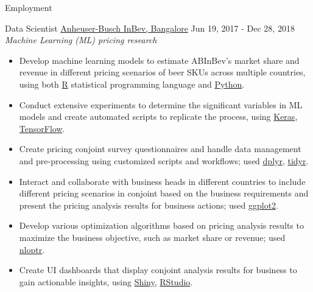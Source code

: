 \documentclass[]{mcdowellcv}
\begin{document}
\begin{cvsection}{Employment}
      \begin{cvsubsection}
        {Data Scientist}
        {\href{https://www.abinbev-india.com/}{Anheuser-Busch InBev, Bangalore}}
        {Jun 19, 2017 - Dec 28, 2018}
        \textit{Machine Learning (ML) pricing research}
          \begin{itemize}
            \item
              Develop machine learning models to estimate ABInBev's market
              share and revenue in different pricing scenarios of beer SKUs
              across multiple countries, using both
              \href{https://www.r-project.org/about.html}{R} statistical
              programming language and \href{https://www.python.org/}{Python}.
            \item
              Conduct extensive experiments to determine the significant
              variables in ML models and create automated scripts to replicate
              the process, using \href{https://keras.io/}{Keras},
              \href{https://www.tensorflow.org/}{TensorFlow}.
            \item
              Create pricing conjoint survey questionnaires and handle data
              management and pre-processing using customized scripts and
              workflows; used \href{https://dplyr.tidyverse.org/}{dplyr},
              \href{https://tidyr.tidyverse.org/}{tidyr}.
            \item
              Interact and collaborate with business heads in different
              countries to include different pricing scenarios in conjoint
              based on the business requirements and present the pricing
              analysis results for business actions; used
              \href{https://ggplot2.tidyverse.org/}{ggplot2}.
            \item
              Develop various optimization algorithms based on pricing analysis
              results to maximize the business objective, such as market share
              or revenue; used
              \href{https://cran.r-project.org/web/packages/nloptr/}{nloptr}.
            \item
              Create UI dashboards that display conjoint analysis results for
              business to gain actionable insights, using
              \href{https://shiny.rstudio.com/}{Shiny},
              \href{https://posit.co/}{RStudio}.
          \end{itemize}
      \end{cvsubsection}
    \end{cvsection}
\end{document}
